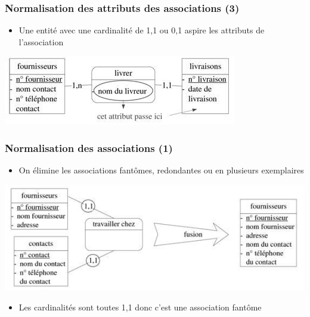 \begin{frame}
  \frametitle{Normalisation des attributs des associations (3)}
  \begin{itemize}
    \item Une entité avec une cardinalité de 1,1 ou 0,1 aspire les attributs de l'association
  \end{itemize}
  \begin{center}
    \includegraphics[width=0.6\linewidth]{normalisation_attribut_association.jpg}
  \end{center}
\end{frame}

\begin{frame}
  \frametitle{Normalisation des associations (1)}
  \begin{itemize}
    \item On élimine les associations fantômes, redondantes ou en plusieurs exemplaires
  \end{itemize}
  \begin{center}
    \includegraphics[width=0.9\linewidth]{association_fantome.jpg}
  \end{center}
  \begin{itemize}
    \item Les cardinalités sont toutes 1,1 donc c'est une association fantôme
  \end{itemize}
\end{frame}

